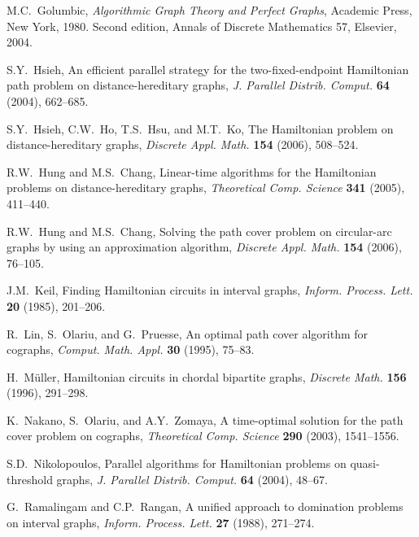 \documentclass[10pt]{article}
\begin{document}
\begin{thebibliography}{99}
 M.C.~Golumbic, {\it Algorithmic Graph Theory and Perfect Graphs},
Academic Press, New York, 1980. Second edition, Annals of Discrete
Mathematics 57, Elsevier, 2004.







 S.Y.~Hsieh, An efficient parallel strategy for the
two-fixed-endpoint Hamiltonian path problem on distance-hereditary
graphs, {\it J. Parallel Distrib. Comput.} {\bf 64} (2004),
662--685.

 S.Y.~Hsieh, C.W.~Ho, T.S.~Hsu, and M.T.~Ko, The Hamiltonian
problem on distance-hereditary graphs, {\it Discrete Appl. Math.}
{\bf 154} (2006), 508--524.

 R.W.~Hung and M.S.~Chang, Linear-time algorithms for the
Hamiltonian problems on distance-hereditary graphs, {\it
Theoretical Comp. Science} {\bf 341} (2005), 411--440.

 R.W.~Hung and M.S.~Chang, Solving the path cover problem on
circular-arc graphs by using an approximation algorithm, {\it
Discrete Appl. Math.} {\bf 154} (2006), 76--105.



  J.M.~Keil, Finding Hamiltonian circuits in interval graphs, {\it
Inform. Process. Lett.} {\bf 20} (1985), 201--206.



 R.~Lin, S.~Olariu, and G.~Pruesse, An optimal path cover algorithm
for cographs, {\it Comput. Math. Appl.} {\bf 30} (1995), 75--83.





  H.~M\"{u}ller, Hamiltonian circuits in chordal bipartite graphs,
{\it Discrete Math.} {\bf 156} (1996), 291--298.

 K.~Nakano, S.~Olariu, and A.Y.~Zomaya, A time-optimal solution for
the path cover problem on cographs, {\it Theoretical Comp.
Science} {\bf 290} (2003), 1541--1556.

  S.D.~Nikolopoulos, Parallel algorithms for Hamiltonian problems on
quasi-threshold graphs, {\it J. Parallel Distrib. Comput.} {\bf
64} (2004), 48--67.



G.~Ramalingam and C.P.~Rangan, A unified approach to domination
problems on interval graphs, {\it Inform. Process. Lett.} {\bf 27}
(1988), 271--274.






\end{thebibliography}
\end{document}

